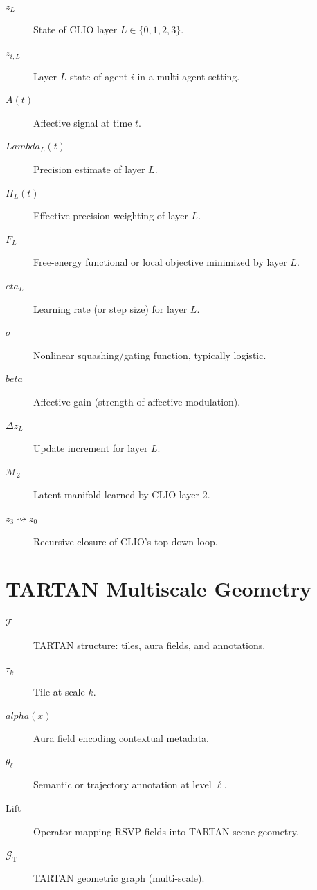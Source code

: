 \documentclass[12pt,oneside]{book}
\theoremstyle{plain}
\theoremstyle{definition}
\def\alpha{alpha}%
\def\beta{beta}%
\def\eta{eta}%
\def\Lambda{Lambda}%
\begin{document}
\begin{description}

  \item[$z_L$] State of CLIO layer $L \in \{0,1,2,3\}$.

  \item[$z_{i,L}$] Layer-$L$ state of agent $i$ in a multi-agent setting.

  \item[$A(t)$] Affective signal at time $t$.

  \item[$\Lambda_L(t)$] Precision estimate of layer $L$.

  \item[$\Pi_L(t)$] Effective precision weighting of layer $L$.

  \item[$F_L$] Free-energy functional or local objective minimized by layer $L$.

  \item[$\eta_L$] Learning rate (or step size) for layer $L$.

  \item[$\sigma$] Nonlinear squashing/gating function, typically logistic.

  \item[$\beta$] Affective gain (strength of affective modulation).

  \item[$\Delta z_L$] Update increment for layer $L$.

  \item[$\mathcal{M}_2$] Latent manifold learned by CLIO layer 2.

  \item[$z_{3}\rightsquigarrow z_{0}$] Recursive closure of CLIO’s top-down loop.

\end{description}

\section{TARTAN Multiscale Geometry}

\begin{description}

  \item[$\mathcal{T}$] TARTAN structure: tiles, aura fields, and annotations.

  \item[$\tau_k$] Tile at scale $k$.

  \item[$\alpha(x)$] Aura field encoding contextual metadata.

  \item[$\theta_\ell$] Semantic or trajectory annotation at level $\ell$.

  \item[$\mathrm{Lift}$] Operator mapping RSVP fields into TARTAN scene geometry.

  \item[$\mathcal{G}_{\mathrm{T}}$] TARTAN geometric graph (multi-scale).

\end{description}
\end{document}
